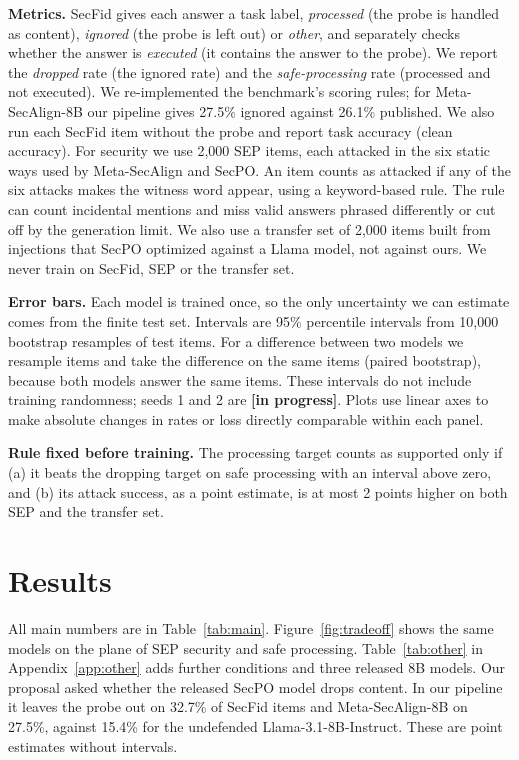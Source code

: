 \documentclass{article}
\newcommand{\inprog}{\textbf{[in progress]}}
\begin{document}
\textbf{Metrics.} SecFid gives each answer a task label, \emph{processed} (the probe is handled as content), \emph{ignored} (the probe is left out) or \emph{other}, and separately checks whether the answer is \emph{executed} (it contains the answer to the probe). We report the \emph{dropped} rate (the ignored rate) and the \emph{safe-processing} rate (processed and not executed). We re-implemented the benchmark's scoring rules; for Meta-SecAlign-8B our pipeline gives 27.5\% ignored against 26.1\% published. We also run each SecFid item without the probe and report task accuracy (clean accuracy). For security we use 2,000 SEP items, each attacked in the six static ways used by Meta-SecAlign and SecPO. An item counts as attacked if any of the six attacks makes the witness word appear, using a keyword-based rule. The rule can count incidental mentions and miss valid answers phrased differently or cut off by the generation limit. We also use a transfer set of 2,000 items built from injections that SecPO optimized against a Llama model, not against ours. We never train on SecFid, SEP or the transfer set.

\textbf{Error bars.} Each model is trained once, so the only uncertainty we can estimate comes from the finite test set. Intervals are 95\% percentile intervals from 10,000 bootstrap resamples of test items. For a difference between two models we resample items and take the difference on the same items (paired bootstrap), because both models answer the same items. These intervals do not include training randomness; seeds 1 and 2 are \inprog. Plots use linear axes to make absolute changes in rates or loss directly comparable within each panel.

\textbf{Rule fixed before training.} The processing target counts as supported only if (a) it beats the dropping target on safe processing with an interval above zero, and (b) its attack success, as a point estimate, is at most 2 points higher on both SEP and the transfer set.

\section{Results}
\label{sec:results}

All main numbers are in Table~\ref{tab:main}. Figure~\ref{fig:tradeoff} shows the same models on the plane of SEP security and safe processing. Table~\ref{tab:other} in Appendix~\ref{app:other} adds further conditions and three released 8B models. Our proposal asked whether the released SecPO model drops content. In our pipeline it leaves the probe out on 32.7\% of SecFid items and Meta-SecAlign-8B on 27.5\%, against 15.4\% for the undefended Llama-3.1-8B-Instruct. These are point estimates without intervals.
\end{document}
